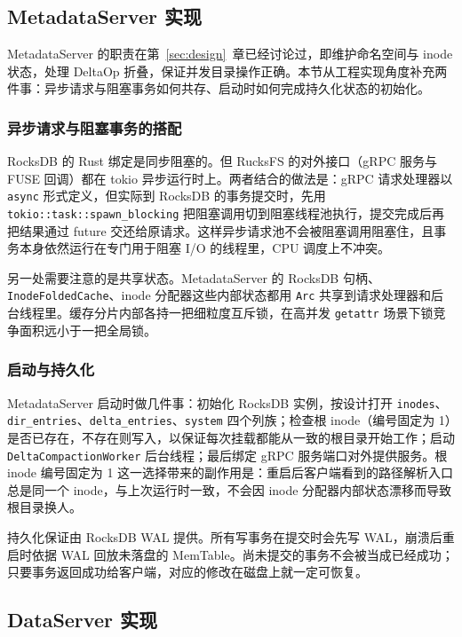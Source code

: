 \subsection{MetadataServer 实现}
\label{sec:impl_mds}

MetadataServer 的职责在第~\ref{sec:design}~章已经讨论过，即维护命名空间与 inode 状态，处理 DeltaOp 折叠，保证并发目录操作正确。本节从工程实现角度补充两件事：异步请求与阻塞事务如何共存、启动时如何完成持久化状态的初始化。

\subsubsection{异步请求与阻塞事务的搭配}

RocksDB 的 Rust 绑定是同步阻塞的。但 RucksFS 的对外接口（gRPC 服务与 FUSE 回调）都在 tokio 异步运行时上。两者结合的做法是：gRPC 请求处理器以 \texttt{async} 形式定义，但实际到 RocksDB 的事务提交时，先用 \texttt{tokio::task::spawn\_blocking} 把阻塞调用切到阻塞线程池执行，提交完成后再把结果通过 future 交还给原请求。这样异步请求池不会被阻塞调用阻塞住，且事务本身依然运行在专门用于阻塞 I/O 的线程里，CPU 调度上不冲突。

另一处需要注意的是共享状态。MetadataServer 的 RocksDB 句柄、\texttt{InodeFoldedCache}、inode 分配器这些内部状态都用 \texttt{Arc} 共享到请求处理器和后台线程里。缓存分片内部各持一把细粒度互斥锁，在高并发 \texttt{getattr} 场景下锁竞争面积远小于一把全局锁。

\subsubsection{启动与持久化}

MetadataServer 启动时做几件事：初始化 RocksDB 实例，按设计打开 \texttt{inodes}、\texttt{dir\_entries}、\texttt{delta\_entries}、\texttt{system} 四个列族；检查根 inode（编号固定为 1）是否已存在，不存在则写入，以保证每次挂载都能从一致的根目录开始工作；启动 \texttt{DeltaCompactionWorker} 后台线程；最后绑定 gRPC 服务端口对外提供服务。根 inode 编号固定为 1 这一选择带来的副作用是：重启后客户端看到的路径解析入口总是同一个 inode，与上次运行时一致，不会因 inode 分配器内部状态漂移而导致根目录换人。

持久化保证由 RocksDB WAL 提供。所有写事务在提交时会先写 WAL，崩溃后重启时依据 WAL 回放未落盘的 MemTable。尚未提交的事务不会被当成已经成功；只要事务返回成功给客户端，对应的修改在磁盘上就一定可恢复。

\subsection{DataServer 实现}
\label{sec:impl_ds}

